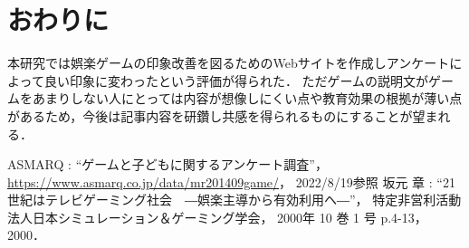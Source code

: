 \documentclass[twocolumn,10pt,a4j]{ltjsarticle}
\begin{document}






\section{おわりに}
本研究では娯楽ゲームの印象改善を図るためのWebサイトを作成しアンケートによって良い印象に変わったという評価が得られた．
ただゲームの説明文がゲームをあまりしない人にとっては内容が想像しにくい点や教育効果の根拠が薄い点があるため，今後は記事内容を研鑽し共感を得られるものにすることが望まれる．


\begin{thebibliography}{99}
 ASMARQ : ``ゲームと子どもに関するアンケート調査''， \url{https://www.asmarq.co.jp/data/mr201409game/}， 2022/8/19参照
 坂元 章 : ``21世紀はテレビゲーミング社会　―娯楽主導から有効利用ヘ―''， 特定非営利活動法人日本シミュレーション＆ゲーミング学会， 2000年 10 巻 1 号 p.4-13， 2000．
\end{thebibliography}
\end{document}
